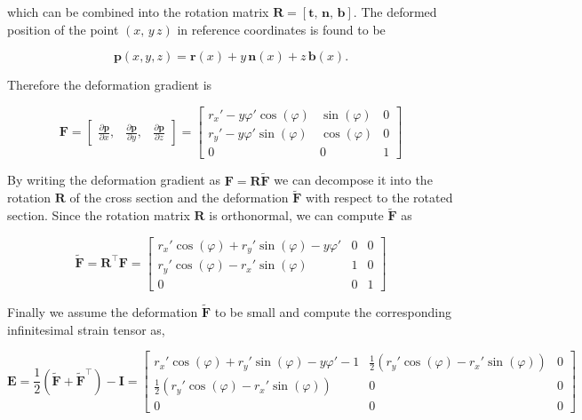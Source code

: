 which can be combined into the rotation matrix $\boldsymbol{R} = \left[\boldsymbol{t},\,\boldsymbol{n},\,\boldsymbol{b}\right]$.
The deformed position of the point $(x,\,y\,z)$ in reference coordinates is found to be

\begin{equation}
\boldsymbol{p}(x,y,z) = \boldsymbol{r}(x) + y\,\boldsymbol{n}(x) + z\,\boldsymbol{b}(x).
\end{equation}

Therefore the deformation gradient is

\begin{equation}
\boldsymbol{F}
=
\begin{bmatrix}
\frac{\partial\boldsymbol{p}}{\partial x}, & \frac{\partial\boldsymbol{p}}{\partial y}, & \frac{\partial\boldsymbol{p}}{\partial z} 
\end{bmatrix}
=
\begin{bmatrix}
r_x' - y\varphi'\cos(\varphi) & \sin(\varphi) & 0\\
r_y' - y\varphi'\sin(\varphi) & \cos(\varphi) & 0\\
0                             & 0             & 1
\end{bmatrix}
\end{equation}

By writing the deformation gradient as $\boldsymbol{F} = \boldsymbol{R}\tilde{\boldsymbol{F}}$ we can decompose it into the rotation $\boldsymbol{R}$ of the cross section and the deformation $\tilde{\boldsymbol{F}}$ with respect to the rotated section.
Since the rotation matrix $\boldsymbol{R}$ is orthonormal, we can compute $\tilde{\boldsymbol{F}}$ as

\begin{equation}
\tilde{\boldsymbol{F}} = \boldsymbol{R}^\intercal\boldsymbol{F} =
\begin{bmatrix}
r_x'\cos(\varphi) + r_y'\sin(\varphi) - y\varphi' & 0 & 0 \\
r_y'\cos(\varphi) - r_x'\sin(\varphi) & 1 & 0 \\
0 & 0 & 1
\end{bmatrix}
\end{equation}

Finally we assume the deformation $\tilde{\boldsymbol{F}}$ to be small and compute the corresponding infinitesimal strain tensor as,

\begin{equation}
\boldsymbol{E} = \frac{1}{2}\left(\tilde{\boldsymbol{F}} + \tilde{\boldsymbol{F}}^\intercal\right) - \boldsymbol{I} =
\begin{bmatrix}
r_x'\cos(\varphi) + r_y'\sin(\varphi) - y\varphi' - 1 & \frac{1}{2}\left(r_y'\cos(\varphi) - r_x'\sin(\varphi)\right) & 0 \\
\frac{1}{2}\left(r_y'\cos(\varphi) - r_x'\sin(\varphi)\right) & 0 & 0 \\
0 & 0 & 0
\end{bmatrix}
\end{equation}

